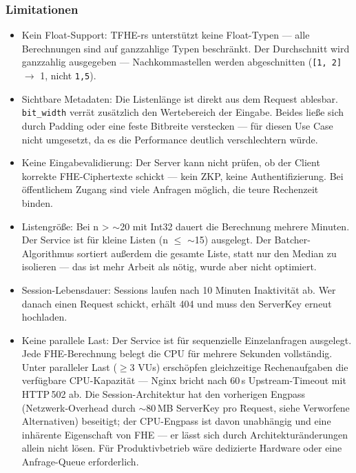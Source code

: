 \subsubsection{Limitationen}
\begin{itemize}
    \item Kein Float-Support: TFHE-rs unterstützt keine Float-Typen — alle Berechnungen sind auf ganzzahlige Typen beschränkt. Der Durchschnitt wird ganzzahlig ausgegeben — Nachkommastellen werden abgeschnitten (\verb|[1, 2]| $\rightarrow$ 1, nicht \verb|1,5|).
    \item Sichtbare Metadaten: Die Listenlänge ist direkt aus dem Request ablesbar. \verb|bit_width| verrät zusätzlich den Wertebereich der Eingabe. Beides ließe sich durch Padding oder eine feste Bitbreite verstecken — für diesen Use Case nicht umgesetzt, da es die Performance deutlich verschlechtern würde.
    \item Keine Eingabevalidierung: Der Server kann nicht prüfen, ob der Client korrekte FHE-Ciphertexte schickt — kein ZKP, keine Authentifizierung. Bei öffentlichem Zugang sind viele Anfragen möglich, die teure Rechenzeit binden.
    \item Listengröße: Bei n > $\sim$20 mit Int32 dauert die Berechnung mehrere Minuten. Der Service ist für kleine Listen (n $\leq$ $\sim$15) ausgelegt. Der Batcher-Algorithmus sortiert außerdem die gesamte Liste, statt nur den Median zu isolieren — das ist mehr Arbeit als nötig, wurde aber nicht optimiert.
    \item Session-Lebensdauer: Sessions laufen nach 10 Minuten Inaktivität ab. Wer danach einen Request schickt, erhält 404 und muss den ServerKey erneut hochladen.
    \item Keine parallele Last: Der Service ist für sequenzielle Einzelanfragen ausgelegt. Jede FHE-Berechnung belegt die CPU für mehrere Sekunden vollständig. Unter paralleler Last ($\geq$3 VUs) erschöpfen gleichzeitige Rechenaufgaben die verfügbare CPU-Kapazität — Nginx bricht nach 60\,s Upstream-Timeout mit HTTP\,502 ab. Die Session-Architektur hat den vorherigen Engpass (Netzwerk-Overhead durch $\sim$80\,MB ServerKey pro Request, siehe Verworfene Alternativen) beseitigt; der CPU-Engpass ist davon unabhängig und eine inhärente Eigenschaft von FHE — er lässt sich durch Architekturänderungen allein nicht lösen. Für Produktivbetrieb wäre dedizierte Hardware oder eine Anfrage-Queue erforderlich.
\end{itemize}